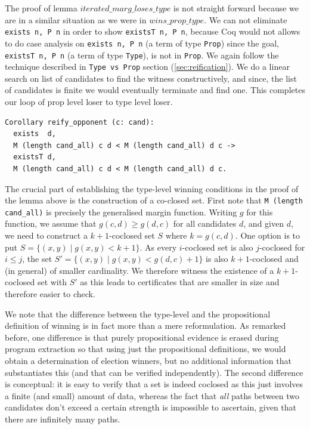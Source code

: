 The proof of lemma  $iterated\_marg\_loses\_type$ is not straight forward because
we are in a similar situation  as we were in $wins\_prop\_type$. 
We can not eliminate \texttt{exists n, P n} in order to show \texttt{existsT n, P n},
because Coq would not allows to do case analysis on \texttt{exists n, P n} (a term of 
type \texttt{Prop}) since the goal, \texttt{existsT n, P n} (a term of type \texttt{Type}), is not in
\texttt{Prop}. We again follow the technique described in 
\texttt{Type vs Prop} section (\ref{sec:reification}).
We do  a linear search on list of candidates  to find the witness constructively, and since, 
the list of candidates is  finite we would eventually terminate and find one.  
This completes our loop of prop level loser to type level loser. 


\begin{verbatim}
Corollary reify_opponent (c: cand):
  exists  d, 
  M (length cand_all) c d < M (length cand_all) d c ->
  existsT d, 
  M (length cand_all) c d < M (length cand_all) d c.
\end{verbatim}



\noindent
The crucial part of establishing the type-level winning conditions
in the proof of the lemma above is the construction of a co-closed set. 
First note that \texttt{M (length cand\_all)} is precisely
the generalised margin function. Writing $g$ for this function, we
assume that $g(c, d) \geq g(d, c)$ for all candidates $d$, and given
$d$, we need to construct a $k+1$-coclosed set $S$ where $k = g(c, d)$.
One option is to put
$S = \lbrace (x, y) \mid g(x, y) < k+1 \rbrace$. As every
$i$-coclosed set is also $j$-coclosed for $i \leq j$, the set $S' =
\lbrace (x, y) \mid g(x, y) < g(d, c) + 1 \rbrace$ is also
$k+1$-coclosed and (in general) of smaller cardinality. We therefore
witness the existence of a $k+1$-coclosed set with $S'$ as this
leads to certificates that are smaller in size and therefore easier
to check.

We note that the difference between the type-level and the
propositional definition of winning 
is in fact more than a mere reformulation. As remarked before, one
difference is that purely propositional evidence is erased during
program extraction so that using just the propositional definitions,
we would obtain a determination of election winners, but no
additional information that substantiates this (and that can be
verified independently). The second difference is conceptual: it is
easy to verify that a set is indeed coclosed as this just involves a
finite (and small) amount of data, whereas the fact that \emph{all} paths
between two candidates don't exceed a certain strength is impossible
to ascertain, given that there are infinitely many paths.

